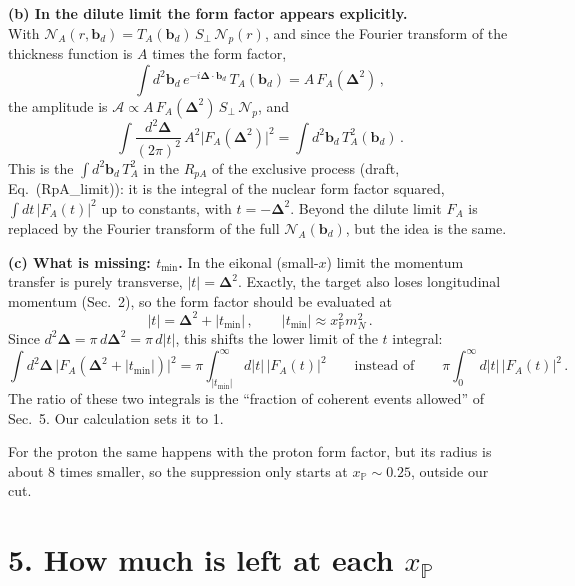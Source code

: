 \documentclass[12pt]{article}
\begin{document}
\textbf{(b) In the dilute limit the form factor appears explicitly.}\\ With
$\mathcal N_A(r,\mathbf b_d)=T_A(\mathbf b_d)\,S_\perp\,\mathcal N_p(r)$, and since the Fourier
transform of the thickness function is $A$ times the form factor,
\begin{equation}
  \int d^2\mathbf b_d\,e^{-i\boldsymbol\Delta\cdot\mathbf b_d}\,T_A(\mathbf b_d)=A\,F_A(\boldsymbol\Delta^2)\,,
\end{equation}
the amplitude is $\mathcal A\propto A\,F_A(\boldsymbol\Delta^2)\,S_\perp\,\mathcal N_p$, and
\begin{equation}
  \int\frac{d^2\boldsymbol\Delta}{(2\pi)^2}\,A^2\big|F_A(\boldsymbol\Delta^2)\big|^2
  =\int d^2\mathbf b_d\,T_A^2(\mathbf b_d)\,.
\end{equation}
This is the $\int d^2\mathbf b_d\,T_A^2$ in the $R_{pA}$ of the exclusive process (draft,
Eq.~(RpA\_limit)): it is the integral of the nuclear form factor squared,
$\int dt\,|F_A(t)|^2$ up to constants, with $t=-\boldsymbol\Delta^2$. Beyond the dilute limit
$F_A$ is replaced by the Fourier transform of the full $\mathcal N_A(\mathbf b_d)$, but the idea is
the same.

\textbf{(c) What is missing: $t_{\min}$.} In the eikonal (small-$x$) limit the momentum transfer is
purely transverse, $|t|=\boldsymbol\Delta^2$. Exactly, the target also loses longitudinal momentum
(Sec.~2), so the form factor should be evaluated at
\begin{equation}
  |t|=\boldsymbol\Delta^2+|t_{\min}|\,,\qquad |t_{\min}|\approx x_{\mathbb P}^2m_N^2\,.
\end{equation}
Since $d^2\boldsymbol\Delta=\pi\,d\boldsymbol\Delta^2=\pi\,d|t|$, this shifts the lower limit of the
$t$ integral:
\begin{equation}
  \int d^2\boldsymbol\Delta\,\big|F_A(\boldsymbol\Delta^2+|t_{\min}|)\big|^2
  =\pi\int_{|t_{\min}|}^\infty d|t|\,\big|F_A(t)\big|^2
  \qquad\text{instead of}\qquad
  \pi\int_0^\infty d|t|\,\big|F_A(t)\big|^2\,.
\end{equation}
The ratio of these two integrals is the ``fraction of coherent events allowed'' of Sec.~5. Our
calculation sets it to 1.

For the proton the same happens with the proton form factor, but its radius is about 8 times
smaller, so the suppression only starts at $x_{\mathbb P}\sim0.25$, outside our cut.

\section*{5. How much is left at each $x_{\mathbb P}$}
\end{document}
